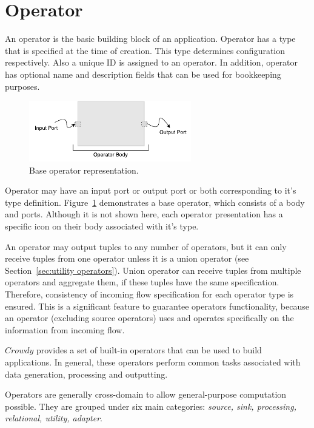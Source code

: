 \section{Operator}
\label{sec:operator}
An operator is the basic building block of an application. Operator has a type that is 
specified at the time of creation. This type determines configuration respectively. Also a 
unique ID is assigned to an operator. In addition, operator has optional name and 
description fields that can be used for bookkeeping purposes.

\begin{figure}[ht]
	\centering
	\includegraphics[height=100px]{figures/basicoperator.pdf}
	\caption{Base operator representation.}
	\label{fig:basic operator}
\end{figure}

Operator may have an input port or output port or both corresponding to it's type 
definition. Figure~\ref{fig:basic operator} demonstrates a base operator, which 
consists of a body and ports. Although it is not shown here, each operator presentation 
has a specific icon on their body associated with it's type.

An operator may output tuples to any number of operators, but it can only receive 
tuples from one operator unless it is a union operator (see Section~\ref{sec:utility operators}). 
Union operator can receive tuples from multiple operators and aggregate them,
if these tuples have the same specification. Therefore, consistency of incoming flow 
specification for each operator type is ensured. 
This is a significant feature to guarantee operators functionality, because an operator 
(excluding source operators) uses and operates specifically on the 
information from incoming flow.

$Crowdy$ provides a set of built-in operators that can be used to build applications. 
In general, these operators perform common tasks associated with data generation, 
processing and outputting.

Operators are generally cross-domain to allow general-purpose 
computation possible. They are grouped under six main categories: 
\textit{source, sink, processing, relational, utility, adapter}.

